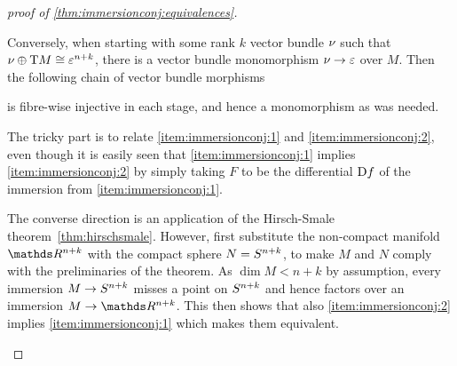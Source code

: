 \begin{proof}[proof of \autoref{thm:immersionconj:equivalences}]
\begin{description}
    Conversely, when starting with some rank $k$ vector bundle $\nu_{}$
    such that $\nu_{}\oplus\mathrm{T}M\cong\varepsilon^{n+k}$, there is a vector
    bundle monomorphism $\nu_{}\to\varepsilon$ over $M$. Then the
    following chain of vector bundle morphisms
    \begin{center}
    \end{center}
    is fibre-wise injective in each stage, and hence a monomorphism as
    was needed.
  \item[\ref{item:immersionconj:1}$\Leftrightarrow$\ref{item:immersionconj:2}:]
    The tricky part is to relate \ref{item:immersionconj:1} and
    \ref{item:immersionconj:2}, even though it is easily seen that
    \ref{item:immersionconj:1} implies \ref{item:immersionconj:2} by
    simply taking $F$ to be the differential $\mathrm{D} f$ of the
    immersion from \ref{item:immersionconj:1}.
    
    The converse direction is an application of the Hirsch-Smale
    theorem~\autoref{thm:hirschsmale}.
    However, first substitute the non-compact manifold $\R^{n+k}$ with
    the compact sphere $N=S^{n+k}$, to make $M$ and $N$ comply
    with the preliminaries of the theorem. As $\dim M<n+k$ by assumption,
    every immersion $M\to S^{n+k}$ misses a point on
    $S^{n+k}$ and hence factors over an immersion $M\to\R^{n+k}$.
    This then shows that also \ref{item:immersionconj:2} implies
    \ref{item:immersionconj:1} which makes them equivalent.
  \end{description}
\end{proof}



